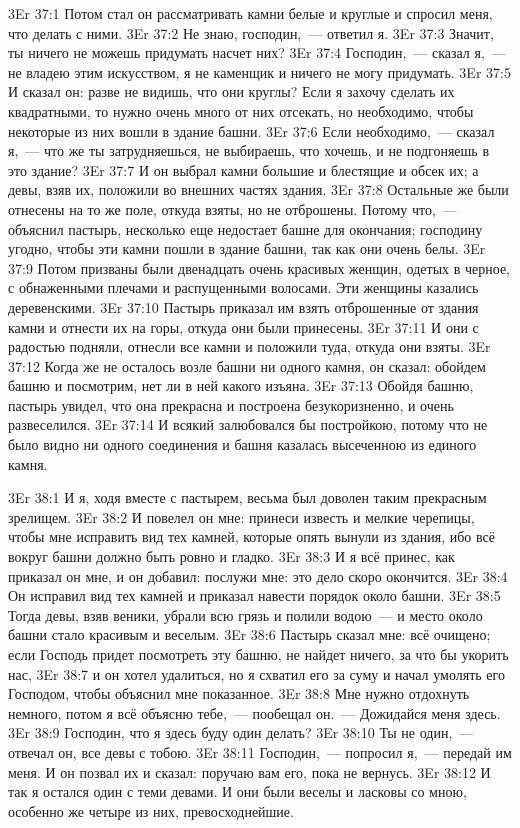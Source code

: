 \vs 3Er 37:1
Потом стал он
рассматривать камни белые и круглые и спросил меня, что делать с ними.
\vs 3Er 37:2
Не знаю, господин,~--- ответил я.
\vs 3Er 37:3
Значит, ты ничего не
можешь придумать насчет них?
\vs 3Er 37:4
Господин,~--- сказал я,~--- не
владею этим искусством, я не каменщик и ничего не могу придумать.
\vs 3Er 37:5
И сказал он: разве не
видишь, что они круглы? Если я захочу сделать их квадратными, то нужно очень
много от них отсекать, но необходимо, чтобы некоторые из них вошли в здание
башни.
\vs 3Er 37:6
Если необходимо,~--- сказал
я,~--- что же ты затрудняешься, не выбираешь, что хочешь, и не подгоняешь в это
здание?
\vs 3Er 37:7
И он выбрал камни большие
и блестящие и обсек их; а девы, взяв их, положили во внешних частях здания.
\vs 3Er 37:8
Остальные же были отнесены
на то же поле, откуда взяты, но не отброшены. Потому что,~--- объяснил пастырь,
несколько еще недостает башне для окончания; господину угодно, чтобы эти
камни пошли в здание башни, так как они очень белы.
\vs 3Er 37:9
Потом призваны были
двенадцать очень красивых женщин, одетых в черное, с обнаженными плечами и
распущенными волосами. Эти женщины казались деревенскими.
\vs 3Er 37:10
Пастырь приказал им взять
отброшенные от здания камни и отнести их на горы, откуда они были принесены.
\vs 3Er 37:11
И они с радостью подняли,
отнесли все камни и положили туда, откуда они взяты.
\vs 3Er 37:12
Когда же не осталось
возле башни ни одного камня, он сказал: обойдем башню и посмотрим, нет ли в
ней какого изъяна.
\vs 3Er 37:13
Обойдя башню, пастырь
увидел, что она прекрасна и построена безукоризненно, и очень развеселился.
\vs 3Er 37:14
И всякий залюбовался бы
постройкою, потому что не было видно ни одного соединения и башня казалась
высеченною из единого камня.

\vs 3Er 38:1
И я, ходя вместе с
пастырем, весьма был доволен таким прекрасным зрелищем.
\vs 3Er 38:2
И повелел он мне: принеси
известь и мелкие черепицы, чтобы мне исправить вид тех камней, которые опять
вынули из здания, ибо всё вокруг башни должно быть ровно и гладко.
\vs 3Er 38:3
И я всё принес, как
приказал он мне, и он добавил: послужи мне: это дело скоро окончится.
\vs 3Er 38:4
Он исправил вид тех камней
и приказал навести порядок около башни.
\vs 3Er 38:5
Тогда девы, взяв веники,
убрали всю грязь и полили водою~--- и место около башни стало красивым и
веселым.
\vs 3Er 38:6
Пастырь сказал мне: всё
очищено; если Господь придет посмотреть эту башню, не найдет ничего, за что бы
укорить нас,
\vs 3Er 38:7
и он хотел удалиться, но я
схватил его за суму и начал умолять его Господом, чтобы объяснил мне
показанное.
\vs 3Er 38:8
Мне нужно отдохнуть
немного, потом я всё объясню тебе,~--- пообещал он.~--- Дожидайся меня здесь.
\vs 3Er 38:9
Господин, что я здесь буду
один делать?
\vs 3Er 38:10
Ты не один,~--- отвечал он,
все девы с тобою.
\vs 3Er 38:11
Господин,~--- попросил я,~--- передай им меня. И он позвал их и сказал: поручаю вам его, пока не вернусь.
\vs 3Er 38:12
И так я остался один с
теми девами. И они были веселы и ласковы со мною, особенно же четыре из них,
превосходнейшие.

